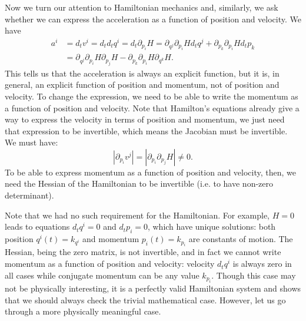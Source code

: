 Now we turn our attention to Hamiltonian mechanics and, similarly, we ask whether we can express the acceleration as a function of position and velocity. We have
\begin{equation}
	\begin{aligned}
		a^i &= d_t v^i = d_t d_t q^i = d_t \partial_{p_i} H = \partial_{q^j} \partial_{p_i} H d_t q^j + \partial_{p_k} \partial_{p_i} H d_t p_k \\
		&= \partial_{q^j} \partial_{p_i} H \partial_{p_j} H - \partial_{p_k} \partial_{p_i} H \partial_{q^k} H.
	\end{aligned}
\end{equation}
This tells us that the acceleration is always an explicit function, but it is, in general, an explicit function of position and momentum, not of position and velocity. To change the expression, we need to be able to write the momentum as a function of position and velocity. Note that Hamilton's equations already give a way to express the velocity in terms of position and momentum, we just need that expression to be invertible, which means the Jacobian must be invertible. We must have:
\begin{equation}
	\left|\partial_{p_i} v^j\right| = \left|\partial_{p_i}\partial_{p_j} H\right| \neq 0 .
\end{equation}
To be able to express momentum as a function of position and velocity, then, we need the Hessian of the Hamiltonian to be invertible (i.e. to have non-zero determinant).

Note that we had no such requirement for the Hamiltonian. For example, $H=0$ leads to equations $d_t q^i = 0$ and $d_t p_i = 0$, which have unique solutions: both position $q^i(t) = k_{q^i}$ and momentum $p_i(t) = k_{p_i}$ are constants of motion. The Hessian, being the zero matrix, is not invertible, and in fact we cannot write momentum as a function of position and velocity: velocity $d_t q^i$ is always zero in all cases while conjugate momentum can be any value $k_{p_i}$. Though this case may not be physically interesting, it is a perfectly valid Hamiltonian system and shows that we should always check the trivial mathematical case. However, let us go through a more physically meaningful case.

